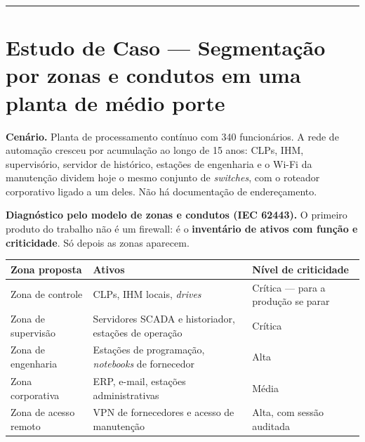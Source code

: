 \begin{center}\rule{0.5\linewidth}{0.5pt}\end{center}

\section{\texorpdfstring{Estudo de Caso --- Segmentação por zonas e condutos em uma planta de médio porte}{Estudo de Caso  Segmentação por zonas e condutos em uma planta de médio porte}}\label{estudo-de-caso-segmentauxe7uxe3o-por-zonas-e-condutos-em-uma-planta-de-muxe9dio-porte}

\textbf{Cenário.} Planta de processamento contínuo com 340 funcionários. A rede de automação cresceu
por acumulação ao longo de 15 anos: CLPs, IHM, supervisório, servidor de histórico, estações de
engenharia e o Wi-Fi da manutenção dividem hoje o mesmo conjunto de \emph{switches}, com o roteador
corporativo ligado a um deles. Não há documentação de endereçamento.

\textbf{Diagnóstico pelo modelo de zonas e condutos (IEC 62443).} O primeiro produto do trabalho não é
um firewall: é o \textbf{inventário de ativos com função e criticidade}. Só depois as zonas aparecem.

\begin{longtable}[]{@{}
  >{\raggedright\arraybackslash}p{}
  >{\raggedright\arraybackslash}p{}
  >{\raggedright\arraybackslash}p{}@{}}
\toprule\noalign{}
\begin{minipage}[b]{\linewidth}\raggedright
Zona proposta
\end{minipage} & \begin{minipage}[b]{\linewidth}\raggedright
Ativos
\end{minipage} & \begin{minipage}[b]{\linewidth}\raggedright
Nível de criticidade
\end{minipage} \\
\midrule\noalign{}
\endhead
\bottomrule\noalign{}
\endlastfoot
Zona de controle & CLPs, IHM locais, \emph{drives} & Crítica --- para a produção se parar \\
Zona de supervisão & Servidores SCADA e historiador, estações de operação & Crítica \\
Zona de engenharia & Estações de programação, \emph{notebooks} de fornecedor & Alta \\
Zona corporativa & ERP, e-mail, estações administrativas & Média \\
Zona de acesso remoto & VPN de fornecedores e acesso de manutenção & Alta, com sessão auditada \\
\end{longtable}

